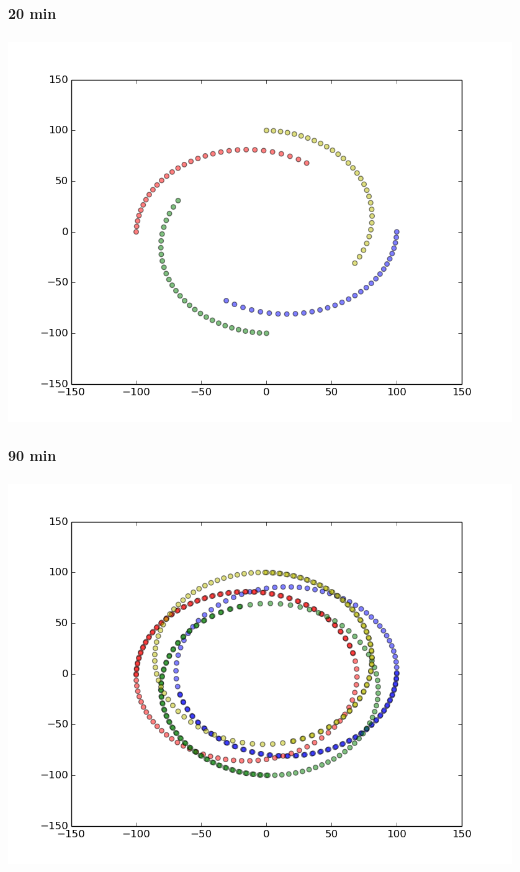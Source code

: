 \documentclass[15pt]{report}
\begin{document}
\paragraph{20 min}
\centerline{\includegraphics[scale=0.3]{ex1_2}}

\paragraph{90 min}
\centerline{\includegraphics[scale=0.3]{ex1_3}}
\end{document}
